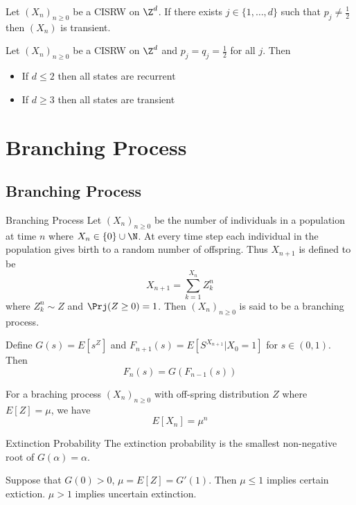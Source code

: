 \documentclass[a4paper]{article}
\begin{document}
\begin{prp}{}{} Let $(X_n)_{n\geq 0}$ be a CISRW on $\Z^d$. If there exists $j\in\{1,\dots,d\}$ such that $p_j\neq\frac{1}{2}$ then $(X_n)$ is transient. 
\end{prp}

\begin{prp}{}{} Let $(X_n)_{n\geq 0}$ be a CISRW on $\Z^d$ and $p_j=q_j=\frac{1}{2}$ for all $j$. Then
\begin{itemize}
\item If $d\leq 2$ then all states are recurrent
\item If $d\geq 3$ then all states are transient
\end{itemize}
\end{prp}

\pagebreak
\section{Branching Process}
\subsection{Branching Process}
\begin{defn}{Branching Process}{} Let $(X_n)_{n\geq 0}$ be the number of individuals in a population at time $n$ where $X_n\in\{0\}\cup\N$. At every time step each individual in the population gives birth to a random number of offspring. Thus $X_{n+1}$ is defined to be $$X_{n+1}=\sum_{k=1}^{X_n}Z_k^n$$ where $Z_k^n\sim Z$ and $\Prj(Z\geq 0)=1$. Then $(X_n)_{n\geq 0}$ is said to be a branching process. 
\end{defn}

\begin{prp}{}{} Define $G(s)=E[s^Z]$ and $F_{n+1}(s)=E[S^{X_{n+1}}|X_0=1]$ for $s\in(0,1)$. Then $$F_n(s)=G(F_{n-1}(s))$$
\end{prp}

\begin{prp}{}{} For a braching process $(X_n)_{n\geq 0}$ with off-spring distribution $Z$ where $E[Z]=\mu$, we have $$E[X_n]=\mu^n$$
\end{prp}

\begin{thm}{Extinction Probability}{} The extinction probability is the smallest non-negative root of $G(\alpha)=\alpha$. 
\end{thm}

\begin{thm}{}{} Suppose that $G(0)>0$, $\mu=E[Z]=G'(1)$. Then $\mu\leq 1$ implies certain extiction. $\mu>1$ implies uncertain extinction. 
\end{thm}
\end{document}
